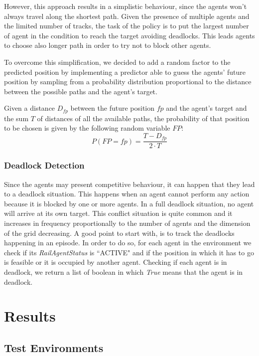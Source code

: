 \documentclass[12pt]{article}
\begin{document}
However, this approach results in a simplistic behaviour, since the agents won't always travel along the shortest path. Given the presence of multiple agents and the limited number of tracks, the task of the policy is to put the largest number of agent in the condition to reach the target avoiding deadlocks. This leads agents to choose also longer path in order to try not to block other agents.
 
To overcome this simplification, we decided to add a random factor to the predicted position by implementing a predictor able to guess the agents' future position by sampling from a probability distribution proportional to the distance between the possible paths and the agent's target.

Given a distance $D_{fp}$ between the future position $fp$ and the agent's target and the sum $T$ of distances of all the available paths, the probability of that position to be chosen is given by the following random variable $FP$:
\begin{equation}
P(FP=fp) = \frac{T - D_{fp}}{2 \cdot T}    
\end{equation}

\subsubsection{Deadlock Detection}

Since the agents may present competitive behaviour, it can happen that they lead to a deadlock situation. This happens when an agent cannot perform any action because it is blocked by one or more agents. In a full deadlock situation, no agent will arrive at its own target. This conflict situation is quite common and it increases in frequency proportionally to the number of agents and the dimension of the grid decreasing.
A good point to start with, is to track the deadlocks happening in an episode. In order to do so, for each agent in the environment we check if its \textit{RailAgentStatus} is ``ACTIVE" and if the position in which it has to go is feasible or it is occupied by another agent. Checking if each agent is in deadlock, we return a list of boolean in which \textit{True} means that the agent is in deadlock.

\section{Results}

\subsection{Test Environments}
\end{document}
